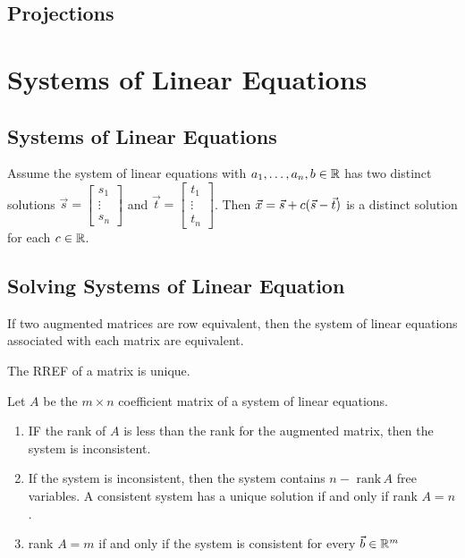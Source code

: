 \documentclass[english,12pt]{article}
\begin{document}
\subsection{Projections}

\section{Systems of Linear Equations}

\subsection{Systems of Linear Equations}

\begin{thrm}
Assume the system of linear equations with $a_{1},\dots,a_{n}, b \in {\mathbb{R}}$ has two distinct solutions $\vec{s} = \begin{bmatrix} s_{1} \\ \vdots \\ s_{n} \end{bmatrix}$ and $\vec{t} = \begin{bmatrix} t_{1} \\ \vdots \\ t_{n} \end{bmatrix}$. Then $\vec{x} = \vec{s} + c(\vec{s} - \vec{t})$ is a distinct solution for each $c \in {\mathbb{R}}$.
\end{thrm}

\subsection{Solving Systems of Linear Equation}

\begin{thrm}
If two augmented matrices are row equivalent, then the system of linear equations associated with each matrix are equivalent.
\end{thrm}

\begin{thrm}
The RREF of a matrix is unique.
\end{thrm}

\begin{thrm}
Let $A$ be the $m \times n$ coefficient matrix of a system of linear equations.
\begin{enumerate}
\item IF the rank of $A$ is less than the rank for the augmented matrix, then the system is inconsistent.
\item If the system is inconsistent, then the system contains $n - \text{ rank}\,A$ free variables. A consistent system has a unique solution if and only if rank $A=n$.
\item rank $A=m$ if and only if the system is consistent for every $\vec{b} \in {\mathbb{R}}^m$
\end{enumerate}
\end{thrm}
\end{document}
